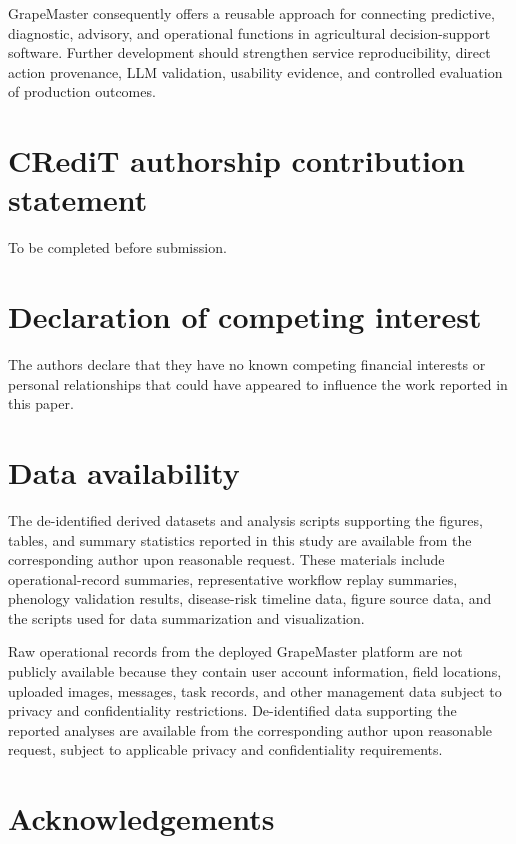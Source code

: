 \documentclass[12pt]{article}
\begin{document}
GrapeMaster consequently offers a reusable approach for connecting predictive, diagnostic, advisory, and operational functions in agricultural decision-support software. Further development should strengthen service reproducibility, direct action provenance, LLM validation, usability evidence, and controlled evaluation of production outcomes.

\section*{CRediT authorship contribution statement}

To be completed before submission.

\section*{Declaration of competing interest}

The authors declare that they have no known competing financial interests or personal relationships that could have appeared to influence the work reported in this paper.

\section*{Data availability}

The de-identified derived datasets and analysis scripts supporting the figures, tables, and summary statistics reported in this study are available from the corresponding author upon reasonable request. These materials include operational-record summaries, representative workflow replay summaries, phenology validation results, disease-risk timeline data, figure source data, and the scripts used for data summarization and visualization.

Raw operational records from the deployed GrapeMaster platform are not publicly available because they contain user account information, field locations, uploaded images, messages, task records, and other management data subject to privacy and confidentiality restrictions. De-identified data supporting the reported analyses are available from the corresponding author upon reasonable request, subject to applicable privacy and confidentiality requirements.

\section*{Acknowledgements}
\end{document}
